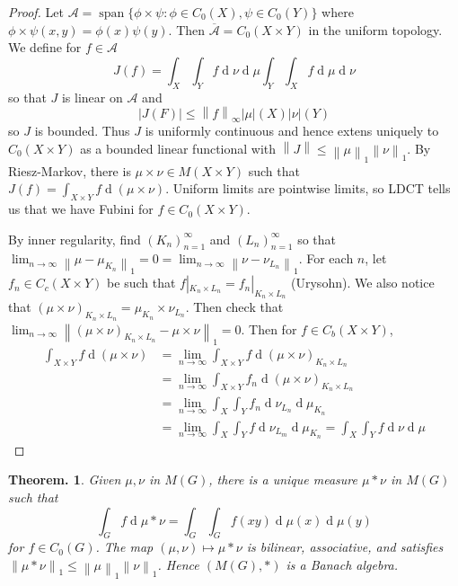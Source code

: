 \documentclass[11pt, a4paper]{memoir}
\newcommand{\norm}[1]{\ensuremath{\left\lVert#1\right\rVert}}
\theoremstyle{change}
\newtheorem{theorem}{Theorem.}[section]
\theoremstyle{plain}
\theoremstyle{nonumberplain}
\newtheorem{proof}{Proof}
\DeclareMathOperator{\spn}{span}
\renewcommand{\d}[1]{\ensuremath{\operatorname{d}\!{#1}}}
\numberwithin{equation}{section}
\begin{document}
\begin{proof}
    Let $\mathcal{A}=\spn\{\phi\times\psi:\phi\in C_0(X),\psi\in C_0(Y)\}$ where $\phi\times\psi(x,y)=\phi(x)\psi(y)$.
    Then $\overline{\mathcal{A}}=C_0(X\times Y)$ in the uniform topology.
    We define for $f\in\mathcal{A}$
    \begin{equation*}
        J(f) = \int_X\int_Y f\d{\nu}\d{\mu}\int_Y\int_X f\d{\mu}\d{\nu}
    \end{equation*}
    so that $J$ is linear on $\mathcal{A}$ and
    \begin{equation*}
        |J(F)|\leq\norm{f}_\infty|\mu|(X)|\nu|(Y)
    \end{equation*}
    so $J$ is bounded.
    Thus $J$ is uniformly continuous and hence extens uniquely to $C_0(X\times Y)$ as a bounded linear functional with $\norm{J}\leq\norm{\mu}_1\norm{\nu}_1$.
    By Riesz-Markov, there is $\mu\times \nu\in M(X\times Y)$ such that $J(f)=\int_{X\times Y}f\d{(\mu\times\nu)}$.
    Uniform limits are pointwise limits, so LDCT tells us that we have Fubini for $f\in C_0(X\times Y)$.

    By inner regularity, find $(K_n)_{n=1}^\infty$ and $(L_n)_{n=1}^\infty$ so that $\lim_{n\to\infty}\norm{\mu-\mu_{K_n}}_1=0=\lim_{n\to\infty}\norm{\nu-\nu_{L_n}}_1$.
    For each $n$, let $f_n\in C_c(X\times Y)$ be such that $f|_{K_n\times L_n}=f_n|_{K_n\times L_n}$ (Urysohn).
    We also notice that $(\mu\times\nu)_{K_n\times L_n}=\mu_{K_n}\times\nu_{L_n}$.
    Then check that $\lim_{n\to\infty}\norm{(\mu\times\nu)_{K_n\times L_n}-\mu\times\nu}_1=0$.
    Then for $f\in C_b(X\times Y)$,
    \begin{align*}
        \int_{X\times Y}f\d{(\mu\times\nu)} &= \lim_{n\to\infty}\int_{X\times Y}f\d{(\mu\times\nu)_{K_n\times L_n}}\\
                                            &= \lim_{n\to\infty}\int_{X\times Y}f_n\d{(\mu\times\nu)_{K_n\times L_n}}\\
                                            &= \lim_{n\to\infty}\int_X\int_Y f_n\d{\nu_{L_n}}\d{\mu_{K_n}}\\
                                            &= \lim_{n\to\infty}\int_X\int_Y f\d{\nu_{L_m}}\d{\mu_{K_n}}=\int_X\int_Y f\d{\nu}\d{\mu}
    \end{align*}
\end{proof}
\begin{theorem}
    Given $\mu,\nu$ in $M(G)$, there is a unique measure $\mu*\nu$ in $M(G)$ such that
    \begin{equation*}
        \int_G f\d{\mu*\nu}=\int_G\int_Gf(xy)\d{\mu(x)}\d{\mu(y)}
    \end{equation*}
    for $f\in C_0(G)$.
    The map $(\mu,\nu)\mapsto \mu*\nu$ is bilinear, associative, and satisfies $\norm{\mu*\nu}_1\leq\norm{\mu}_1\norm{\nu}_1$.
    Hence $(M(G),*)$ is a Banach algebra.
\end{theorem}
\end{document}
